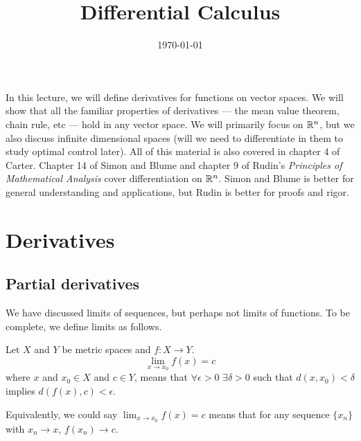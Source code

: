  

\title{Differential Calculus}
\date{\today}



\maketitle

In this lecture, we will define derivatives for functions on vector
spaces. We will show that all the familiar properties of derivatives
--- the mean value theorem, chain rule, etc --- hold in any vector
space. We will primarily focus on $\mathbb{R}^n$, but we also discuss infinite
dimensional spaces (will we need to differentiate in them to study
optimal control later). All of this material is also covered in
chapter 4 of Carter. Chapter 14 of Simon and Blume and chapter 9 of
Rudin's \textsl{Principles of Mathematical Analysis} cover
differentiation on $\mathbb{R}^n$. Simon and Blume is better for general
understanding and applications, but Rudin is better for proofs and
rigor. 

\section{Derivatives}

\subsection{Partial derivatives}
We have discussed limits of sequences, but perhaps not limits of
functions. To be complete, we define limits as follows.
\begin{definition}
  Let $X$ and $Y$ be metric spaces and $f:X \to Y$.
  \[ \lim_{x \to x_0} f(x) = c \]
  where $x$ and $x_0 \in X$ and $c \in Y$, 
  means that $\forall \epsilon > 0$ $\exists \delta > 0$ such that
  $d(x,x_0) < \delta $ implies $d(f(x),c) < \epsilon$. 
\end{definition}
Equivalently, we could say $ \lim_{x \to x_0} f(x) = c $ means that
for any sequence $\{x_n\}$ with $x_n \to x$, $f(x_n) \to c$. 

